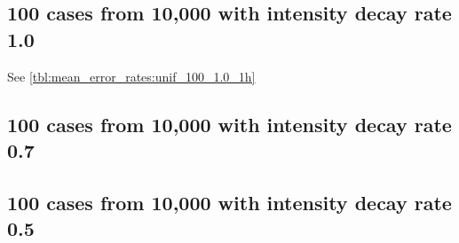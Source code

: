 \subsection{100 cases from 10,000 with intensity decay rate 1.0}

See \autoref{tbl:mean_error_rates:unif_100_1.0_1h}
\begin{table}[H]
\centering
\scriptsize

    \begin{subtable}{0.5\textwidth}
    
    \caption[]{Means} 
    \end{subtable}%
    \begin{subtable}{0.5\textwidth}
    
    \caption[]{Standard deviations} 
    \end{subtable}

\caption[]{Error rates for uniform population of 10,000, single peak intensity of factor 100 and decay rate 1.0}
\label{tbl:mean_error_rates:unif_100_1.0_1h:3}
\end{table}

\subsection{100 cases from 10,000 with intensity decay rate 0.7}
\begin{table}[H]
\centering
\scriptsize

    \begin{subtable}{0.5\textwidth}
    
    \caption[]{Means} 
    \end{subtable}%
    \begin{subtable}{0.5\textwidth}
    
    \caption[]{Standard deviations} 
    \end{subtable}

\caption[]{Error rates for uniform population of 10,000, single peak intensity of factor 100 and decay rate 0.7}
\label{tbl:mean_error_rates:unif_100_0.7_1h}
\end{table}

\subsection{100 cases from 10,000 with intensity decay rate 0.5}
\begin{table}[H]
\centering
\scriptsize

    \begin{subtable}{0.5\textwidth}
    
    \caption[]{Means} 
    \end{subtable}%
    \begin{subtable}{0.5\textwidth}
    
    \caption[]{Standard deviations} 
    \end{subtable}

\caption[]{Error rates for uniform population of 10,000, single peak intensity of factor 100 and decay rate 0.5}
\label{tbl:mean_error_rates:unif_100_0.5_1h}
\end{table}


